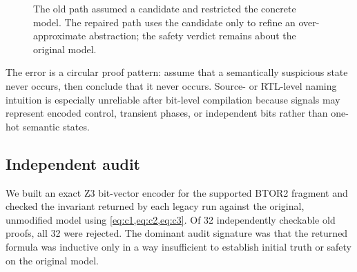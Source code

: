 \documentclass[10pt]{article}
\newcommand{\btor}{\textsc{BTOR2}}
\begin{document}
\begin{figure}[t]
\centering
{}
\caption{The old path assumed a candidate and restricted the concrete model.
The repaired path uses the candidate only to refine an over-approximate
abstraction; the safety verdict remains about the original model.}
\label{fig:trust}
\end{figure}

The error is a circular proof pattern: assume that a semantically suspicious
state never occurs, then conclude that it never occurs.  Source- or RTL-level
naming intuition is especially unreliable after bit-level compilation because
signals may represent encoded control, transient phases, or independent bits
rather than one-hot semantic states.

\subsection{Independent audit}

We built an exact Z3 bit-vector encoder for the supported \btor{} fragment and
checked the invariant returned by each legacy run against the original,
unmodified model using \cref{eq:c1,eq:c2,eq:c3}.  Of 32 independently
checkable old proofs, all 32 were rejected.  The dominant audit signature was
that the returned formula was inductive only in a way insufficient to establish
initial truth or safety on the original model.
\end{document}
